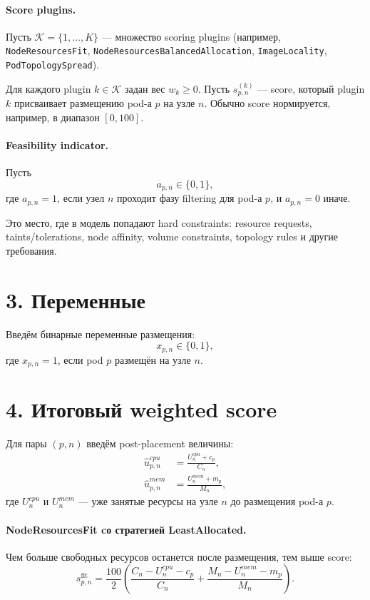 \documentclass[11pt]{article}
\begin{document}
\paragraph{Score plugins.}
Пусть \(\mathcal{K}=\{1,\dots,K\}\) --- множество scoring plugins
(например, \texttt{NodeResourcesFit}, \texttt{NodeResourcesBalancedAllocation},
\texttt{ImageLocality}, \texttt{PodTopologySpread}).

Для каждого plugin \(k\in\mathcal{K}\) задан вес \(w_k \ge 0\).
Пусть \(s_{p,n}^{(k)}\) --- score, который plugin \(k\) присваивает размещению
pod-а \(p\) на узле \(n\).
Обычно score нормируется, например, в диапазон \([0,100]\).

\paragraph{Feasibility indicator.}
Пусть
\[
  a_{p,n}\in\{0,1\},
\]
где \(a_{p,n}=1\), если узел \(n\) проходит фазу filtering для pod-а \(p\),
и \(a_{p,n}=0\) иначе.

Это место, где в модель попадают hard constraints:
resource requests, taints/tolerations, node affinity, volume constraints,
topology rules и другие требования.

\section*{3. Переменные}

Введём бинарные переменные размещения:
\[
  x_{p,n}\in\{0,1\},
\]
где \(x_{p,n}=1\), если pod \(p\) размещён на узле \(n\).

\section*{4. Итоговый weighted score}

Для пары \((p,n)\) введём post-placement величины:
\begin{align*}
  \hat{u}^{cpu}_{p,n} &= \frac{U_n^{cpu} + c_p}{C_n}, \\
  \hat{u}^{mem}_{p,n} &= \frac{U_n^{mem} + m_p}{M_n},
\end{align*}
где \(U_n^{cpu}\) и \(U_n^{mem}\) --- уже занятые ресурсы на узле \(n\) до
размещения pod-а \(p\).

\paragraph{NodeResourcesFit cо стратегией LeastAllocated.}
Чем больше свободных ресурсов останется после размещения, тем выше score:
\[
  s_{p,n}^{\mathrm{fit}} =
  \frac{100}{2}
  \left(
    \frac{C_n - U_n^{cpu} - c_p}{C_n}
    +
    \frac{M_n - U_n^{mem} - m_p}{M_n}
  \right).
\]
\end{document}
